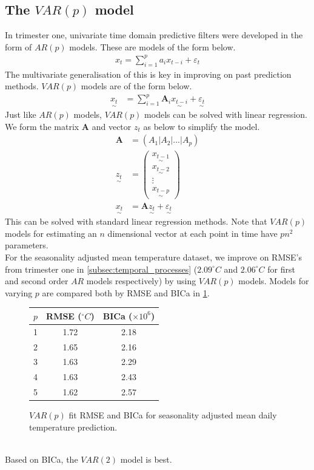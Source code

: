 \documentclass[12pt,a4paper]{article} %
\newcommand{\ve}[1]{\underset{\sim}{#1}}
\begin{document}
\subsection{The $VAR(p)$ model}
In trimester one, univariate time domain predictive filters were developed in the form of $AR(p)$ models. These are models of the form below.
\begin{align*}
    x_t=\sum_{i=1}^pa_ix_{t-i}+\varepsilon_t
\end{align*}
The multivariate generalisation of this is key in improving on past prediction methods. $VAR(p)$ models are of the form below.
\begin{align*}
    \ve{x_t}&=\sum_{i=1}^p\pmb{A}_i\ve{x_{t-i}}+\ve{\varepsilon_t}
\end{align*}
Just like $AR(p)$ models, $VAR(p)$ models can be solved with linear regression. We form the matrix $\pmb{A}$ and vector $z_t$ as below to simplify the model.
\begin{align*}
    \pmb{A}&=(A_1|A_2|...|A_p)\\
    \ve{z_t}&=\begin{pmatrix}
        \ve{x_{t-1}}\\
        \ve{x_{t-2}}\\
        \vdots\\
        \ve{x_{t-p}}
    \end{pmatrix}\\
    \ve{x_t}&=\pmb{A}\ve{z_t}+\ve{\varepsilon_t}
\end{align*}
This can be solved with standard linear regression methods. Note that $VAR(p)$ models for estimating an $n$ dimensional vector at each point in time have $pn^2$ parameters.\\
For the seasonality adjusted mean temperature dataset, we improve on RMSE's from trimester one in \ref{subsec:temporal_processes} ($2.09^\circ C$ and $2.06^\circ C$ for first and second order $AR$ models respectively) by using $VAR(p)$ models. Models for varying $p$ are compared both by RMSE and BICa in \ref{fig:VARp}.
\begin{figure}[!ht]
    \centering
    \begin{tabular}{|c|c|c|}
        \hline
        $p$ & RMSE ($^\circ C$) & BICa ($\times10^6$) \\
        \hline
        1 & 1.72 & 2.18 \\
        \hline
        2 & 1.65 & 2.16 \\
        \hline
        3 & 1.63 & 2.29 \\
        \hline
        4 & 1.63 & 2.43 \\
        \hline
        5 & 1.62 & 2.57 \\
        \hline
    \end{tabular}
    \caption{$VAR(p)$ fit RMSE and BICa for seasonality adjusted mean daily temperature prediction.}
    \label{fig:VARp}
\end{figure}
\\Based on BICa, the $VAR(2)$ model is best.
\end{document}
